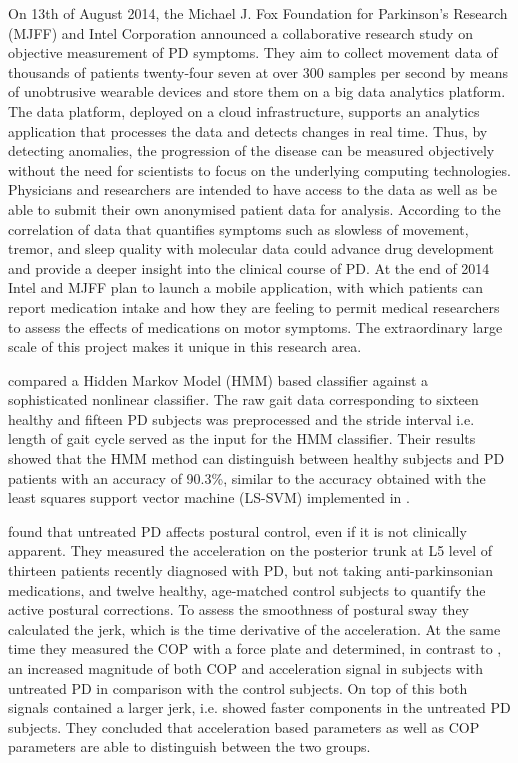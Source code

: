 On 13th of August 2014, the Michael J. Fox Foundation for Parkinson’s Research (MJFF) and Intel Corporation \cite{Intel_2013} announced a collaborative research study on objective measurement of PD symptoms. They aim to collect movement data of thousands of patients twenty-four seven at over 300 samples per second by means of unobtrusive wearable devices and store them on a big data analytics platform. The data platform, deployed on a cloud infrastructure, supports an analytics application that processes the data and detects changes in real time. Thus, by detecting anomalies, the progression of the disease can be measured objectively without the need for scientists to focus on the underlying computing technologies. Physicians and researchers are intended to have access to the data as well as be able to submit their own anonymised patient data for analysis. According to \cite{Intel_2013} the correlation of data that quantifies symptoms such as slowless of movement, tremor, and sleep quality with molecular data could advance drug development and provide a deeper insight into the clinical course of PD. At the end of 2014 Intel and MJFF plan to launch a mobile application, with which patients can report medication intake and how they are feeling to permit medical researchers to assess the effects of medications on motor symptoms. The extraordinary large scale of this project makes it unique in this research area.

\citeauthor{khorasani_hmm_2014} \cite{khorasani_hmm_2014} compared a Hidden Markov Model (HMM) based classifier against a sophisticated nonlinear classifier. The raw gait data corresponding to sixteen healthy and fifteen PD subjects was preprocessed and the stride interval i.e. length of gait cycle served as the input for the HMM classifier. Their results showed that the HMM method can distinguish between healthy subjects and PD patients with an accuracy of 90.3\%, similar to the accuracy obtained with the least squares support vector machine (LS-SVM) implemented in \cite{wu_statistical_2010}.

\citeauthor{mancini_isway:_2012} \cite{mancini_isway:_2012} found that untreated PD affects postural control, even if it is not clinically apparent. They measured the acceleration on the posterior trunk at L5 level of thirteen patients recently diagnosed with PD, but not taking anti-parkinsonian medications, and twelve healthy, age-matched control subjects to quantify the active postural corrections. To assess the smoothness of postural sway they calculated the jerk, which is the time derivative of the acceleration. At the same time they measured the COP with a force plate and determined, in contrast to \cite{mancini_anticipatory_2009}, an increased magnitude of both COP and acceleration signal in subjects with untreated PD in comparison with the control subjects. On top of this both signals contained a larger jerk, i.e. showed faster components in the untreated PD subjects. They concluded that acceleration based parameters as well as COP parameters are able to distinguish between the two groups. 

